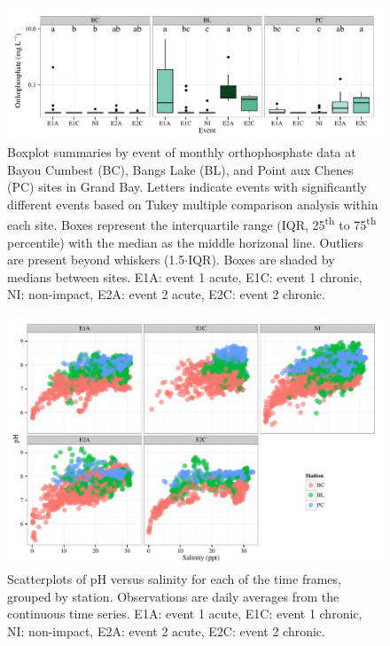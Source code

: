 \documentclass[letterpaper,12pt]{article}\usepackage[]{graphicx}\usepackage[]{color}
\makeatletter
\def\maxwidth{ %
  \ifdim\Gin@nat@width>\linewidth
    \linewidth
  \else
    \Gin@nat@width
  \fi
}
\makeatother
\begin{document}
\begin{figure}[!ht]

{\centering \includegraphics[width=\maxwidth]{figs/tukey-1} 

}

\caption[Boxplot summaries by event of monthly orthophosphate data at Bayou Cumbest (BC), Bangs Lake (BL), and Point aux Chenes (PC) sites in Grand Bay]{Boxplot summaries by event of monthly orthophosphate data at Bayou Cumbest (BC), Bangs Lake (BL), and Point aux Chenes (PC) sites in Grand Bay.  Letters indicate events with significantly different events based on Tukey multiple comparison analysis within each site.  Boxes represent the interquartile range (IQR, 25\textsuperscript{th} to 75\textsuperscript{th} percentile) with the median as the middle horizonal line.  Outliers are present beyond whiskers (1.5$\cdot$IQR). Boxes are shaded by medians between sites.  E1A: event 1 acute, E1C: event 1 chronic, NI: non-impact, E2A: event 2 acute, E2C: event 2 chronic.}\label{fig:tukey}
\end{figure}


\clearpage

\begin{figure}[!ht]

{\centering \includegraphics[width=\maxwidth]{figs/phvsal1-1} 

}

\caption[Scatterplots of pH versus salinity for each of the time frames, grouped by station]{Scatterplots of pH versus salinity for each of the time frames, grouped by station.  Observations are daily averages from the continuous time series. E1A: event 1 acute, E1C: event 1 chronic, NI: non-impact, E2A: event 2 acute, E2C: event 2 chronic.}\label{fig:phvsal1}
\end{figure}
\end{document}

